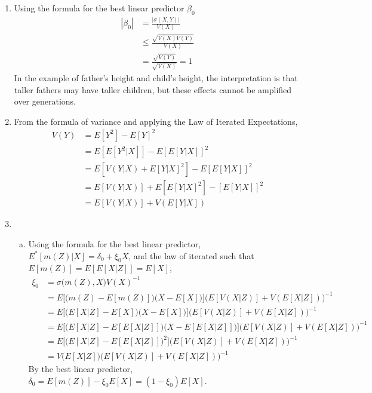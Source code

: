 \documentclass{article}[14pt]
\begin{document}
\begin{enumerate}
    \item Using the formula for the best linear predictor $\beta_0$
    \begin{align*}
        |\beta_0| &= \frac{ | \sigma(X,Y) | }{V(X)} \\
        &\leq \frac{ \sqrt{V(X)V(Y)} }{V(X)} \\
        &= \frac{ \sqrt{V(Y)} }{ \sqrt{V(X)}} = 1
    \end{align*}
    In the example of father's height and child's height, the interpretation is that taller fathers may have taller children, but these effects cannot be amplified over generations.

    \item From the formula of variance and applying the Law of Iterated Expectations,
    \begin{align*}
        V(Y) &= E [Y^2] - E[Y]^2 \\
        &= E [ E [Y^2|X] ] - E [E[Y|X]]^2 \\
        &= E [ V(Y|X) + E[Y|X]^2 ] - E [E[Y|X]]^2 \\
        &= E [ V(Y|X) ] + E [ E[Y|X]^2] - [E[Y|X]]^2 \\
        &= E [ V(Y|X) ] + V ( E [Y|X])
    \end{align*}

    \item
    \begin{enumerate}[(a)]
        \item Using the formula for the best linear predictor, $E^*[m(Z) | X]= \delta_0 + \xi_0 X$, and the law of iterated such that $E[m(Z)] = E[E[X|Z]] = E[X]$,
        \begin{align*}
            \xi_0 &= \sigma\Big(m(Z),X\Big) V(X)^{-1} \\
            &= E\bigg[\Big(m(Z) - E[m(Z)]\Big)\Big(X - E[X]\Big)\bigg] \Big( E[V(X|Z)] + V(E[X|Z]) \Big)^{-1}\\
            &= E\bigg[\Big(E[X|Z] - E[X]\Big)\Big(X - E[X]\Big)\bigg] \Big( E[V(X|Z)] + V(E[X|Z]) \Big)^{-1} \\
            &= E\bigg[\Big(E[X|Z] - E[E[X|Z]]\Big)\Big(X - E[E[X|Z]]\Big)\bigg] \Big( E[V(X|Z)] + V(E[X|Z]) \Big)^{-1} \\
            &= E\bigg[\Big(E[X|Z] - E[E[X|Z]]\Big)^2\bigg] \Big( E[V(X|Z)] + V(E[X|Z]) \Big)^{-1} \\
            &= V\Big(E[X|Z]\Big) \Big( E[V(X|Z)] + V(E[X|Z]) \Big)^{-1}
        \end{align*}
        By the best linear predictor, $\delta_0 = E[m(Z)] - \xi_0 E[X] = (1-\xi_0) E[X]$.


\end{enumerate}
\end{enumerate}
\end{document}
